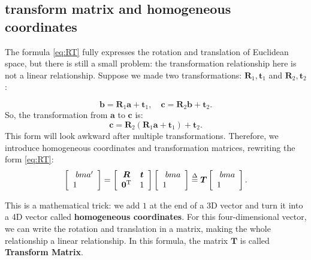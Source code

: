 \subsection{transform matrix and homogeneous coordinates}

The formula \eqref{eq:RT} fully expresses the rotation and translation of Euclidean space, but there is still a small problem: the transformation relationship here is not a linear relationship. Suppose we made two transformations: $ \bm {R}_ 1 , \bm {t}_ 1 $ and $ \bm {R}_ 2 , \bm {t}_ 2 $ :

\[
\bm{b} = {\bm{R}_1} \bm{a} + {\bm{t}_1}, \quad \bm{c} = {\bm{R}_2} \bm{b} + {\bm{t}_2}.
\]
So, the transformation from $ \bm{a} $ to $ \bm{c} $ is:
\[
\bm{c} = {\bm{R}_2}\left( {{\bm{R}_1} \bm{a} + {\bm{t}_1}} \right) + {\bm{t}_2}.
\]
This form will look awkward after multiple transformations. Therefore, we introduce homogeneous coordinates and transformation matrices, rewriting the form \eqref{eq:RT}:
\begin{equation}
\left[\begin{array}{l} 
\ bm {a} ' \\
1
\end{array} \right] = 
\left[ {\begin{array}{*{20}{c}}
	\bm{R}&\bm{t}\\
	{{\bm{0}^\mathrm{T}}}&1
	\end{array}} \right]
\left[ \begin{array}{l}
\ bm {a} \\
1
\end{array} \right]  \buildrel \Delta \over = \bm{T} \left[ \begin{array}{l}
\ bm {a} \\
1
\end{array} \right].
\end{equation}

This is a mathematical trick: we add $ 1 $ at the end of a 3D vector and turn it into a 4D vector called \textbf{homogeneous coordinates}. For this four-dimensional vector, we can write the rotation and translation in a matrix, making the whole relationship a linear relationship. In this formula, the matrix $ \bm {T} $ is called \textbf{Transform Matrix}.


